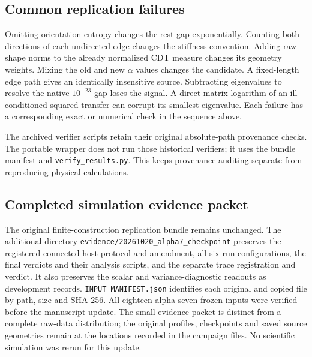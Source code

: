 \subsection{Common replication failures}

Omitting orientation entropy changes the rest gap exponentially. Counting both directions of each undirected edge changes the stiffness convention. Adding raw shape norms to the already normalized CDT measure changes its geometry weights. Mixing the old and new $\alpha$ values changes the candidate. A fixed-length edge path gives an identically insensitive source. Subtracting eigenvalues to resolve the native $10^{-23}$ gap loses the signal. A direct matrix logarithm of an ill-conditioned squared transfer can corrupt its smallest eigenvalue. Each failure has a corresponding exact or numerical check in the sequence above.

The archived verifier scripts retain their original absolute-path provenance checks. The portable wrapper does not run those historical verifiers; it uses the bundle manifest and \texttt{verify\_results.py}. This keeps provenance auditing separate from reproducing physical calculations.


\subsection{Completed simulation evidence packet}

The original finite-construction replication bundle remains unchanged.
The additional directory \nolinkurl{evidence/20261020_alpha7_checkpoint}
preserves the registered connected-host protocol and amendment, all six
run configurations, the final verdicts and their analysis scripts, and
the separate trace registration and verdict. It also preserves the
scalar and variance-diagnostic readouts as development records.
\nolinkurl{INPUT_MANIFEST.json} identifies each original and copied file
by path, size and SHA-256. All eighteen alpha-seven frozen inputs were
verified before the manuscript update. The small evidence packet is
distinct from a complete raw-data distribution; the original profiles,
checkpoints and saved source geometries remain at the locations recorded
in the campaign files. No scientific simulation was rerun for this update.
